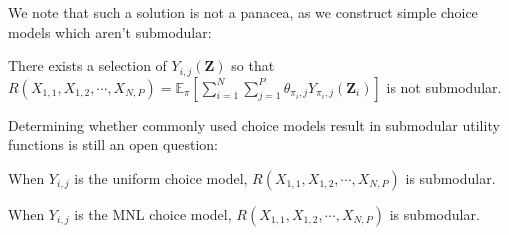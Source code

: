 We note that such a solution is not a panacea, as we construct simple choice models which aren't submodular: 
\begin{lemma}
    There exists a selection of $Y_{i,j}(\mathbf{Z})$ so that $R(X_{1,1},X_{1,2},\cdots,X_{N,P}) = \mathbb{E}_{\pi}[\sum_{i=1}^{N} \sum_{j=1}^{P} \theta_{\pi_{i},j} Y_{\pi_{i},j}(\mathbf{Z}_{i})]$ is not submodular. 
\end{lemma}

Determining whether commonly used choice models result in submodular utility functions is still an open question:

\begin{conjecture}
    When $Y_{i,j}$ is the uniform choice model, $R(X_{1,1},X_{1,2},\cdots,X_{N,P})$ is submodular. 
\end{conjecture}

\begin{conjecture}
    When $Y_{i,j}$ is the MNL choice model, $R(X_{1,1},X_{1,2},\cdots,X_{N,P})$ is submodular. 
\end{conjecture}
